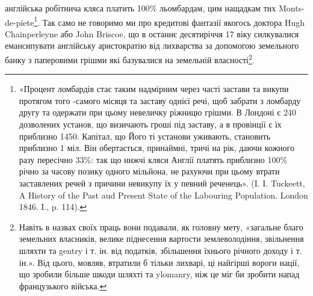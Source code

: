 \parcont{}  %
англійська робітнича кляса платить 100\% льомбардам, цим нащадкам тих Monts-de-piete\footnote{
«Процент ломбардів стає таким надмірним через часті застави та викупи протягом того
-самого місяця та заставу однієї речі, щоб забрати з ломбарду другу та одержати при цьому невеличку
ріжницю грішми. В Лондоні є 240 дозволених установ, що визичають гроші під заставу, а в провінції
є їх приблизно 1450. Капітал, що Його ті установи уживають, становить приблизно 1 міл. Він
обертається,
принаймні, тричі на рік, даючи кожного разу пересічно 33\%: так що нижчі кляси
Англії платять приблизно 100\% річно за часову позику одного мільйона, не рахуючи при цьому втрати
заставлених речей з причини невикупу їх у певний реченець». (I. I. Tuckeett, A History of the Past
aud Present State of the Labouring Population. London 1846. I., p. 114).
}.
Так само не говоримо ми про кредитові фантазії якогось доктора
Hugh Chainperleyne або John Briscoe, що в останнє десятиріччя 17 віку силкувалися
емансипувати англійську аристократію від лихварства за допомогою
земельного банку з паперовими грішми які базувалися на земельній власності\footnote{
Навіть в назвах своїх праць вони подавали, як головну мету, «загальне благо земельних
власників, велике піднесення вартости землеволодіння, звільнення шляхти та gentry і т. ін. від
податків,
збільшення їхнього річного доходу і т. ін.». Від цього, мовляв, втратили б тільки лихварі, ці
найгірші
вороги нації, що зробили більше шкоди шляхті та ylomanry, ніж це міг би зробити напад французького
війська.
}.


